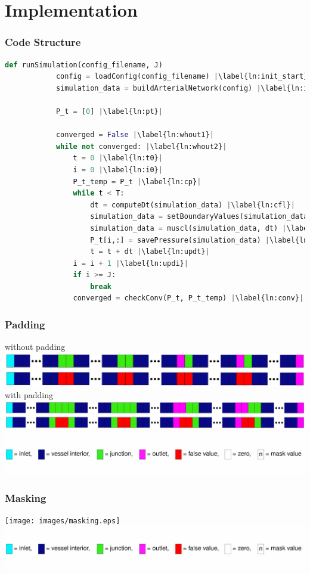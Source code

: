 \documentclass{beamer}
\begin{document}
\section{Implementation}

\begin{frame} [fragile]
	\frametitle{Code Structure}
	\begin{lstlisting}[basicstyle=\fontsize{7}{7}\selectfont\ttfamily, language=Python, caption={$dt \hat{=}$timestep(CFL), setBoundaryValues$\hat{=}$inlet(from data), outlet(Windkessel),junctions(conservation laws), muscl$\hat{=}$Monotonic Upstream-centered Scheme for Conservation Laws(Finite Volume)}, label=lst:pc, escapechar=|] 
		def runSimulation(config_filename, J) 
			config = loadConfig(config_filename) |\label{ln:init_start}|
			simulation_data = buildArterialNetwork(config) |\label{ln:init_end}|

			P_t = [0] |\label{ln:pt}|

			converged = False |\label{ln:whout1}|
			while not converged: |\label{ln:whout2}|
				t = 0 |\label{ln:t0}|
				i = 0 |\label{ln:i0}|
				P_t_temp = P_t |\label{ln:cp}|
				while t < T:
					dt = computeDt(simulation_data) |\label{ln:cfl}|
					simulation_data = setBoundaryValues(simulation_data, dt) |\label{ln:bv    }|
					simulation_data = muscl(simulation_data, dt) |\label{ln:muscl}|
					P_t[i,:] = savePressure(simulation_data) |\label{ln:svp}|
					t = t + dt |\label{ln:updt}|
				i = i + 1 |\label{ln:updi}|
				if i >= J:
					break
				converged = checkConv(P_t, P_t_temp) |\label{ln:conv}|
\end{lstlisting}
\end{frame}
\begin{frame}
	\frametitle{Padding}
	without padding
	\includegraphics[width=\textwidth]{images/padding1.eps}
	with padding
	\includegraphics[width=\textwidth]{images/padding2.eps}
	\includegraphics[width=\textwidth]{images/legend.eps}
\end{frame}
\begin{frame}
	\frametitle{Masking}
	\texttt{[image: images/masking.eps]}
	\includegraphics[width=\textwidth]{images/legend.eps}
\end{frame}
\end{document}
